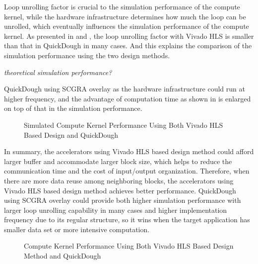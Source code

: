 Loop unrolling factor is crucial to the simulation performance of the compute kernel, while the hardware infrastructure determines how much the loop can be unrolled, which eventually influences the simulation performance of the compute kernel. As presented in  and , the loop unrolling factor with Vivado HLS is smaller than that in QuickDough in many cases. And this explains the comparison of the simulation performance using the two design methods.

\emph{theoretical simulation performance?}

QuickDough using SCGRA overlay as the hardware infrastructure could run at higher frequency, and the advantage of computation time as shown in  is enlarged on top of that in the simulation performance. 

\begin{figure*}[h]
\caption{Simulated Compute Kernel Performance Using Both Vivado HLS Based Design and QuickDough}
\label{fig:kernel-sim-perf}
\end{figure*}

In summary, the accelerators using Vivado HLS based design method could afford larger buffer and accommodate larger block size, which helps to reduce the communication time and the cost of input/output organization. Therefore, when there are more data reuse among neighboring blocks, the accelerators using Vivado HLS based design method achieves better performance. QuickDough using SCGRA overlay could provide both higher simulation performance with larger loop unrolling capability in many cases and higher implementation frequency due to its regular structure, so it wins when the target application has smaller data set or more intensive computation.  

\begin{figure*}[h]
\caption{Compute Kernel Performance Using Both Vivado HLS Based Design Method and QuickDough}
\label{fig:kernel-real-perf}
\end{figure*}

